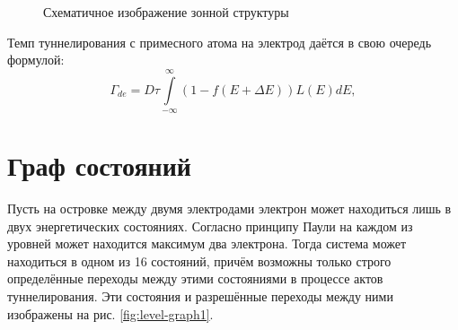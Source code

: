 \documentclass[12pt,a4paper]{report}
\begin{document}
\begin{figure}[h]
	\caption{Схематичное изображение зонной структуры}
	\label{fig:SASET model}
\end{figure}
Темп туннелирования с примесного атома на электрод даётся в свою очередь формулой:
\begin{equation}\label{eq4}
\Gamma_{de} = D\tau \int\limits_{-\infty}^{\infty}(1 - f(E + \Delta E))L(E) dE,
\end{equation}

\section*{Граф состояний}
Пусть на островке между двумя электродами электрон может находиться лишь в двух энергетических состояниях. Согласно принципу Паули на каждом из уровней может находится максимум два электрона. Тогда система может находиться в одном из 16 состояний, причём возможны только строго определённые переходы между этими состояниями в процессе актов туннелирования. Эти состояния и разрешённые переходы между ними изображены на рис. \ref{fig:level-graph1}.
\end{document}
